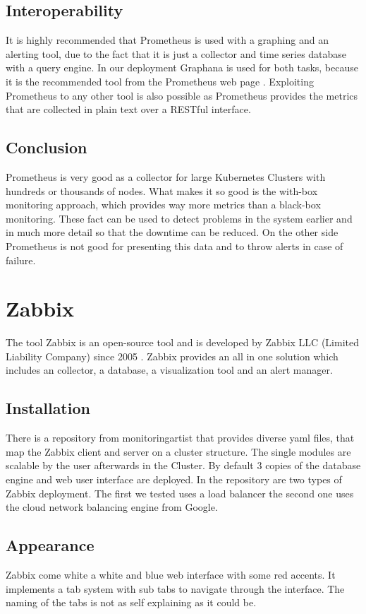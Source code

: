 \subsection{Interoperability}
It is highly recommended that Prometheus is used with a graphing and an alerting tool, due to the fact that it is just a collector and time series database with a query engine. In our deployment Graphana is used for both tasks, because it is the recommended tool from the Prometheus web page \cite{prometheus}. Exploiting Prometheus to any other tool is also possible as Prometheus provides the metrics that are collected in plain text over a RESTful interface.
\subsection{Conclusion}
Prometheus is very good as a collector for large Kubernetes Clusters with hundreds or thousands of nodes. What makes it so good is the with-box monitoring approach, which provides way more metrics than a black-box monitoring. These fact can be used to detect problems in the system earlier and in much more detail so that the downtime can be reduced. On the other side Prometheus is not good for presenting this data and to throw alerts in case of failure.

\section{Zabbix}
\label{Zabbix} %
\cite{Hernantes2015}
The tool Zabbix is an open-source tool and is developed by Zabbix LLC (Limited Liability Company) since 2005 \cite{zabbix}. Zabbix provides an all in one solution which includes an collector, a database, a visualization tool and an alert manager.
\subsection{Installation}
There is a repository from monitoringartist \cite{zabbix_kube} that provides diverse yaml files, that map the Zabbix client and server on a cluster structure. The single modules are scalable by the user afterwards in the Cluster. By default 3 copies of the database engine and web user interface are deployed. In the repository are two types of Zabbix deployment. The first we tested uses a load balancer the second one uses the cloud network balancing engine from Google.
\subsection{Appearance}%
Zabbix come white a white and blue web interface with some red accents. It implements a tab system with sub tabs to navigate through the interface. The naming of the tabs is not as self explaining as it could be.  
